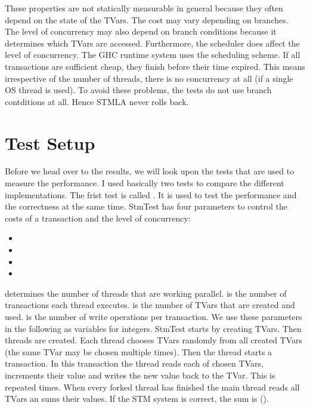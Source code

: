 These properties are not statically measurable in general because they often depend on the state of the TVars. 
The cost may vary depending on branches. The level of concurrency may also 
depend on branch conditions because it determines which TVars are accessed. Furthermore,
the scheduler does affect the level of concurrency. The GHC runtime system uses the 
scheduling scheme. If all transactions are sufficient cheap, they finish before their time expired.
This means irrespective of the number of threads, there is no concurrency at all (if a single OS thread
is used). To avoid these problems, the tests do not use branch contditions at all. Hence STMLA never rolls back.

\section{Test Setup}
Before we head over to the results, we will look upon the tests that are used to measure the performance.
I used basically two tests to compare the different implementations. The frist test is called .
It is used to test the performance and the correctness at the same time. StmTest has four parameters to control
the costs of a transaction and the level of concurrency:
\begin{itemize}
 \item {}
 \item {}
 \item {}
 \item {}
\end{itemize}
 determines the number of threads that are working parallel.  is the number of transactions
each thread executes.  is the number of TVars that are created and used.  is the number of write
operations per transaction. We use these parameters in the following as variables for integers.
StmTest starts by creating  TVars. Then  threads are created. Each thread chooses  TVars randomly from all 
created TVars (the same TVar may be chosen multiple times). Then the thread starts a transaction. In this transaction the thread reads each of chosen 
TVars, increments their value and writes the new value back to the TVar. This is repeated  times. When every forked thread has finished the
main thread reads all TVars an sums their values. If the STM system is correct, the sum is ().

